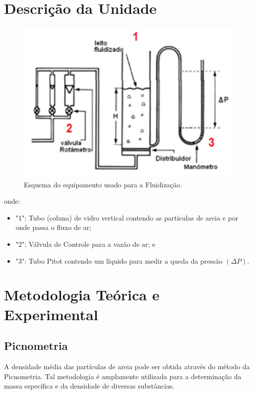 \chapter{Descrição da Unidade}


\begin{figure}[H]
	\begin{center}
		\includegraphics[scale=.8, trim={0 0 0 0}]{figuras/ladeq/fluid/fig4}
		\caption{ Esquema do equipamento usado para a Fluidização.}
		\label{fig4}
	\end{center}
\end{figure}

onde:

\begin{itemize}
\item "1": Tubo (coluna) de vidro vertical contendo as partículas de areia e por onde passa o fluxo de ar;
\item "2": Válvula de Controle para a vazão de ar; e
\item "3": Tubo Pitot contendo um líquido para medir a queda da pressão $ (\Delta P) $.
\end{itemize}


\chapter{Metodologia Teórica e Experimental}

\section{Picnometria}


A densidade média das partículas de areia pode ser obtida através do método da Picnometria. Tal metodologia é amplamente utilizada para a determinação da massa específica e da densidade de diversas substâncias.

